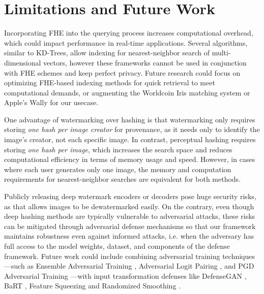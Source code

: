 \vspace{0.2cm}
\section{Limitations and Future Work}
\label{sec:future}
Incorporating FHE into the querying process increases computational overhead, which could impact performance in real-time applications. Several algorithms, similar to KD-Trees, allow indexing for nearest-neighbor search of multi-dimensional vectors, however these frameworks cannot be used in conjunction with FHE schemes and keep perfect privacy. Future research could focus on optimizing FHE-based indexing methods for quick retrieval to meet computational demands, or augmenting the Worldcoin Iris matching system or Apple's Wally for our usecase.

One advantage of watermarking over hashing is that watermarking only requires storing \textit{one hash per image creator} for provenance, as it needs only to identify the image’s creator, not each specific image. In contrast, perceptual hashing requires storing \textit{one hash per image}, which increases the search space and reduces computational efficiency in terms of memory usage and speed. However, in cases where each user generates only one image, the memory and computation requirements for nearest-neighbor searches are equivalent for both methods.

Publicly releasing deep watermark encoders or decoders pose huge security risks, as that allows images to be dewatermarked easily. On the contrary, even though deep hashing methods are typically vulnerable to adversarial attacks, these risks can be mitigated through adversarial defense mechanisms so that our framework maintains robustness even against informed attacks, i.e. when the adversary has full access to the model weights, dataset, and components of the defense framework. Future work could include combining adversarial training techniques—such as Ensemble Adversarial Training \cite{ensemble}, Adversarial Logit Pairing \cite{adversariallogitpairing}, and PGD Adversarial Training \cite{pgddefense}—with input transformation defenses like DefenseGAN \cite{defensegan}, BaRT \cite{bart}, Feature Squeezing \cite{feature} and Randomized Smoothing \cite{randomizedsmoothing}.





